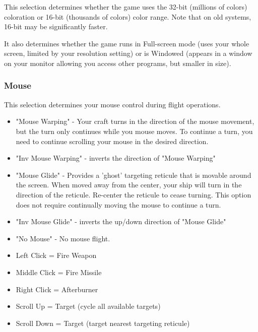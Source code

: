 \documentclass{article}
\begin{document}
This selection determines whether the game uses the 32-bit (millions of colors) coloration or 16-bit (thousands of colors) color range.  Note that on old systems, 16-bit may be significantly faster.



It also determines whether the game runs in Full-screen mode (uses your whole screen, limited by your resolution setting) or is Windowed (appears in a window on your monitor allowing you access other programs, but smaller in size). 



\subsubsection{Mouse }

This selection determines your mouse control during flight operations.



\begin{itemize}
\item  "Mouse Warping"  - Your craft turns in the direction of the mouse movement, but the turn only continues while you  mouse moves. To continue a turn, you need to continue scrolling your mouse in the desired  direction. 
\item  "Inv Mouse Warping" - inverts the direction of "Mouse Warping"
\item  "Mouse Glide" - Provides a 'ghost' targeting reticule that is movable around the screen. When moved away from  the center, your ship will turn in the direction of the reticule. Re-center the reticule to cease turning.  This option does not require continually moving the mouse to continue a turn. 
\item  "Inv Mouse Glide" - inverts the up/down direction of "Mouse Glide"
\item  "No Mouse" - No mouse flight.
\end{itemize}



\begin{itemize}
\item  Left Click = Fire Weapon 
\item  Middle Click  = Fire Missile 
\item  Right Click  = Afterburner 
\item  Scroll Up  = Target (cycle all available targets) 
\item  Scroll Down  = Target (target nearest targeting reticule)
\end{itemize}
\end{document}
